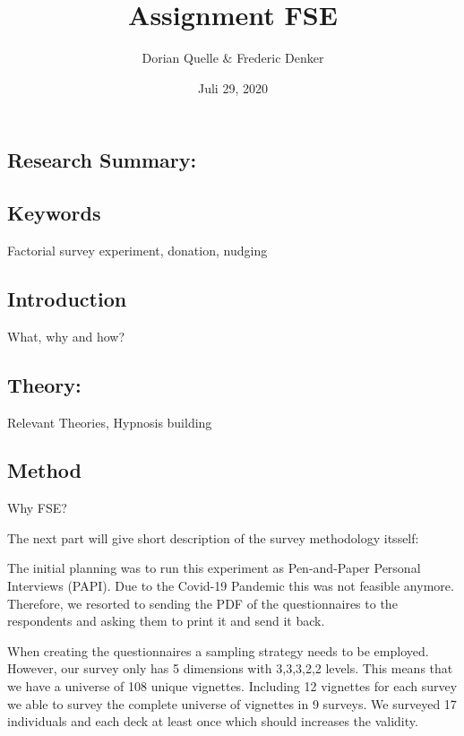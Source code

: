\documentclass[
  12pt,
]{article}
\title{Assignment FSE}
\author{Dorian Quelle \& Frederic Denker}
\date{Juli 29, 2020}
\begin{document}
\maketitle

\hypertarget{research-summary}{%
\subsection{Research Summary:}\label{research-summary}}

\hypertarget{keywords}{%
\subsection{Keywords}\label{keywords}}

Factorial survey experiment, donation, nudging

\newpage

\hypertarget{introduction}{%
\subsection{Introduction}\label{introduction}}

What, why and how?

\hypertarget{theory}{%
\subsection{Theory:}\label{theory}}

Relevant Theories, Hypnosis building

\hypertarget{method}{%
\subsection{Method}\label{method}}

Why FSE?

The next part will give short description of the survey methodology
itsself:

The initial planning was to run this experiment as Pen-and-Paper
Personal Interviews (PAPI). Due to the Covid-19 Pandemic this was not
feasible anymore. Therefore, we resorted to sending the PDF of the
questionnaires to the respondents and asking them to print it and send
it back.

When creating the questionnaires a sampling strategy needs to be
employed. However, our survey only has 5 dimensions with 3,3,3,2,2
levels. This means that we have a universe of 108 unique vignettes.
Including 12 vignettes for each survey we able to survey the complete
universe of vignettes in 9 surveys. We surveyed 17 individuals and each
deck at least once which should increases the validity.
\end{document}

